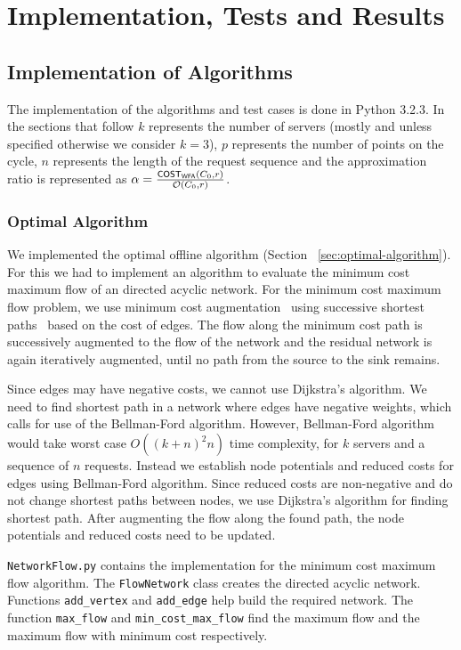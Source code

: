 \chapter{Implementation, Tests and Results}\label{ch:tests-results}

\section{Implementation of Algorithms}\label{sec:algorithm-implementation}

The implementation of the algorithms and test cases is done in Python 3.2.3. In the sections that follow $k$ represents the number of servers (mostly and unless specified otherwise we consider $k=3$), $p$ represents the number of points on the cycle, $n$ represents the length of the request sequence and the approximation ratio is represented as $\alpha = \frac{\sf{COST}_{\sf{WFA}} (C_0,r)}{\mathcal{O}(C_0,r)}$.

\subsection{Optimal Algorithm}

We implemented the optimal offline algorithm (Section ~\ref{sec:optimal-algorithm}). For this we had to implement an algorithm to evaluate the  minimum cost maximum flow of an directed acyclic network. For the minimum cost maximum flow problem, we use minimum cost augmentation~\cite{Tar-b} using successive shortest paths~\cite{AMO-b} based on the cost of edges. The flow along the minimum cost path is successively augmented to the flow of the network and the residual network is again iteratively augmented, until no path from the source to the sink remains.

Since edges may have negative costs, we cannot use Dijkstra's algorithm. We need to find shortest path in a network where edges have negative weights, which calls for use of the Bellman-Ford algorithm. However, Bellman-Ford algorithm would take worst case $O((k+n)^2n)$ time complexity, for $k$ servers and a sequence of $n$ requests. Instead we establish node potentials and reduced  costs for edges using Bellman-Ford algorithm. Since reduced costs are non-negative and do not change shortest paths between nodes, we use Dijkstra's algorithm for finding shortest path. After augmenting the flow along the found path, the node potentials and reduced costs need to be updated.

\texttt{NetworkFlow.py} contains the implementation for the minimum cost maximum flow algorithm. The \texttt{FlowNetwork} class creates the directed acyclic network. Functions \texttt{add\_vertex} and \texttt{add\_edge} help build the required network. The function \texttt{max\_flow} and \texttt{min\_cost\_max\_flow} find the maximum flow and the maximum flow with minimum cost respectively. \\


